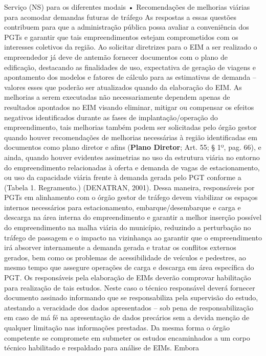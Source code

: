 \documentclass[]{article}
\begin{document}
Serviço (NS) para os diferentes modais • Recomendações de melhorias
viárias para acomodar demandas futuras de tráfego As respostas a essas
questões contribuem para que a administração pública possa avaliar a
conveniência dos PGTs e garantir que tais empreendimentos estejam
comprometidos com os interesses coletivos da região. Ao solicitar
diretrizes para o EIM a ser realizado o empreendedor já deve de antemão
fornecer documentos com o plano de edificação, destacando as finalidades
de uso, expectativa de geração de viagens e apontamento dos modelos e
fatores de cálculo para as estimativas de demanda -- valores esses que
poderão ser atualizados quando da elaboração do EIM. As melhorias a
serem executadas não necessariamente dependem apenas de resultados
apontados no EIM visando eliminar, mitigar ou compensar os efeitos
negativos identificados durante as fases de implantação/operação do
empreendimento, tais melhorias também podem ser solicitadas pelo órgão
gestor quando houver recomendações de melhorias necessárias à região
identificadas em documentos como plano diretor e afins (\textbf{Plano
Diretor}; Art. 55; § 1º, pag. 66), e ainda, quando houver evidentes
assimetrias no uso da estrutura viária no entorno do empreendimento
relacionadas à oferta e demanda de vagas de estacionamento, ou uso da
capacidade viária frente à demanda gerada pelo PGT conforme a (Tabela 1.
Regramento.) (DENATRAN, 2001). Dessa maneira, responsáveis por PGTs em
alinhamento com o órgão gestor de tráfego devem viabilizar os espaços
internos necessários para estacionamento, embarque/desembarque e carga e
descarga na área interna do empreendimento e garantir a melhor inserção
possível do empreendimento na malha viária do município, reduzindo a
perturbação no tráfego de passagem e o impacto na vizinhança ao garantir
que o empreendimento irá absorver internamente a demanda gerada e tratar
os conflitos externos gerados, bem como os problemas de acessibilidade
de veículos e pedestres, ao mesmo tempo que assegure operações de carga
e descarga em área específica do PGT. Os responsáveis pela elaboração de
EIMs deverão comprovar habilitação para realização de tais estudos.
Neste caso o técnico responsável deverá fornecer documento assinado
informando que se responsabiliza pela supervisão do estudo, atestando a
veracidade dos dados apresentados -- sob pena de responsabilização em
caso de má fé na apresentação de dados precários sem a devida menção de
qualquer limitação nas informações prestadas. Da mesma forma o órgão
competente se compromete em submeter os estudos encaminhados a um corpo
técnico habilitado e respaldado para análise de EIMs. Embora
\end{document}
